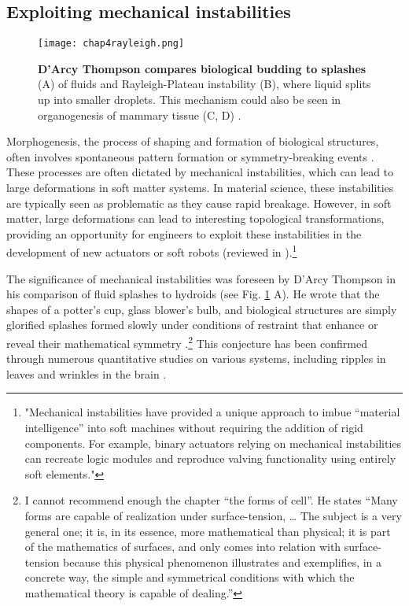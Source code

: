 \hypertarget{exploiting-mechanical-instabilities}{%
	\subsection{Exploiting mechanical
		instabilities}\label{exploiting-mechanical-instabilities}}

\begin{figure}
	\centering
	\texttt{[image: chap4rayleigh.png]}
	\caption{\label{fig_4_4} \textbf{D'Arcy Thompson compares biological budding to splashes} (A) of fluids and Rayleigh-Plateau instability \cite{thompson1979} (B), where liquid splits up into smaller droplets. This mechanism could also be seen in organogenesis of mammary tissue (C, D) \cite{fernandez2021}.}
\end{figure}

Morphogenesis, the process of shaping and formation of biological structures, often involves spontaneous pattern formation or symmetry-breaking events \cite{ishihara2018}. These processes are often dictated by mechanical instabilities, which can lead to large deformations in soft matter systems. In material science, these instabilities are typically seen as problematic as they cause rapid breakage. However, in soft matter, large deformations can lead to interesting topological transformations, providing an opportunity for engineers to exploit these instabilities in the development of new actuators or soft robots (reviewed in \cite{pal2021}).\footnote{"Mechanical instabilities have provided a unique approach to imbue “material intelligence” into soft machines without requiring the addition of rigid components. For example, binary actuators relying on mechanical instabilities can recreate logic modules and reproduce valving functionality using entirely soft elements."}

The significance of mechanical instabilities was foreseen by D'Arcy Thompson in his comparison of fluid splashes to hydroids (see Fig. \ref{fig_4_4} A). He wrote that the shapes of a potter's cup, glass blower's bulb, and biological structures are simply glorified splashes formed slowly under conditions of restraint that enhance or reveal their mathematical symmetry \cite{thompson1979}.\footnote{ I cannot recommend enough the chapter “the forms of cell”. He states “Many forms are capable of realization under surface-tension, … The subject is a very general one; it is, in its essence, more mathematical than physical; it is part of the mathematics of surfaces, and only comes into relation with surface-tension because this physical phenomenon illustrates and exemplifies, in a concrete way, the simple and symmetrical conditions with which the mathematical theory is capable of dealing.”}
This conjecture has been confirmed through numerous quantitative studies on various systems, including ripples in leaves and wrinkles in the brain \cite{liang2009, karzbrun2018}.

